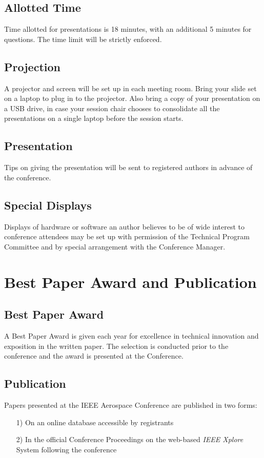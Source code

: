 \documentclass[twocolumn,letterpaper]{IEEEAerospaceCLS}  %
\begin{document}
\subsection{Allotted Time}
Time allotted for presentations is 18 minutes, with an additional 5 minutes for questions. The time limit will be strictly enforced.

\subsection{Projection}
A projector and screen will be set up in each meeting room. Bring your slide set on a laptop to plug in to the projector. Also bring a copy of your presentation on a USB drive, in case your session chair chooses to consolidate all the presentations on a single laptop before the session starts.

\subsection{Presentation}
Tips on giving the presentation will be sent to registered authors in advance of the conference.


\subsection{Special Displays}
Displays of hardware or software an author believes to be of wide interest to conference attendees may be set up with permission of the Technical Program Committee and by special arrangement with the Conference Manager.

\section{Best Paper Award and Publication}
\subsection{Best Paper Award}
A Best Paper Award is given each year for excellence in technical innovation and exposition in the written paper. The selection is conducted prior to the conference and the award is presented at the Conference.

\subsection{Publication}
Papers presented at the IEEE Aerospace Conference are published in two forms:
\begin{itemize}
  \item [1)] On an online database accessible by registrants \\
  \item [2)] In the official Conference Proceedings on the web-based {\it{IEEE Xplore}} System following the conference
\end{itemize}
\end{document}
